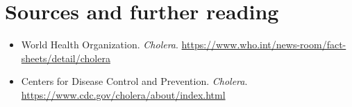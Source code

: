 \section*{Sources and further reading}
\begin{itemize}
    \item World Health Organization. \textit{Cholera}. \url{https://www.who.int/news-room/fact-sheets/detail/cholera}
    \item Centers for Disease Control and Prevention. \textit{Cholera}. \url{https://www.cdc.gov/cholera/about/index.html}
\end{itemize}
